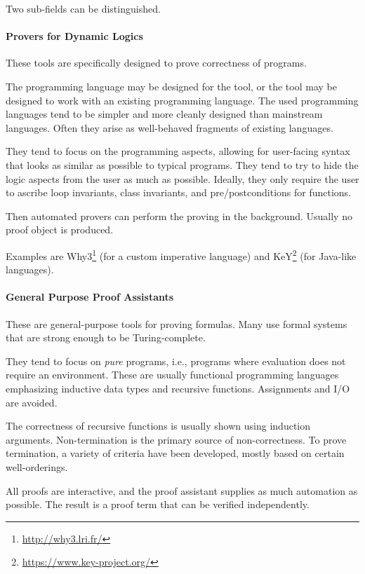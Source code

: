 Two sub-fields can be distinguished.

\paragraph{Provers for Dynamic Logics}
These tools are specifically designed to prove correctness of programs.

The programming language may be designed for the tool, or the tool may be designed to work with an existing programming language.
The used programming languages tend to be simpler and more cleanly designed than mainstream languages.
Often they arise as well-behaved fragments of existing languages.

They tend to focus on the programming aspects, allowing for user-facing syntax that looks as similar as possible to typical programs.
They tend to try to hide the logic aspects from the user as much as possible.
Ideally, they only require the user to ascribe loop invariants, class invariants, and pre/postconditions for functions.

Then automated provers can perform the proving in the background.
Usually no proof object is produced.

Examples are Why3\footnote{\url{http://why3.lri.fr/}} \cite{why3} (for a custom imperative language) and KeY\footnote{\url{https://www.key-project.org/}} \cite{key} (for Java-like languages).


\paragraph{General Purpose Proof Assistants}
These are general-purpose tools for proving formulas.
Many use formal systems that are strong enough to be Turing-complete.

They tend to focus on \emph{pure} programs, i.e., programs where evaluation does not require an environment.
These are usually functional programming languages emphasizing inductive data types and recursive functions.
Assignments and I/O are avoided.

The correctness of recursive functions is usually shown using induction arguments.
Non-termination is the primary source of non-correctness.
To prove termination, a variety of criteria have been developed, mostly based on certain well-orderings.

All proofs are interactive, and the proof assistant supplies as much automation as possible.
The result is a proof term that can be verified independently.

